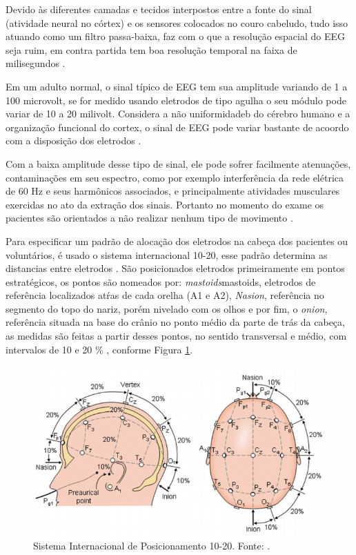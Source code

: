 Devido às diferentes camadas e tecidos interpostos entre a fonte do sinal (atividade neural no córtex) e os sensores colocados no couro cabeludo, tudo isso atuando como um filtro passa-baixa, faz com o que a resolução 
espacial do EEG seja ruim, em contra partida tem boa resolução temporal na faixa de milisegundos \cite{raobrain}.
 
Em um adulto normal, o sinal típico de EEG tem sua amplitude variando de 1 a 100 microvolt, se for medido usando eletrodos de tipo agulha o seu módulo pode variar de 10 a 20 milivolt. Considera a não uniformidadeb do cérebro humano e a organização funcional do cortex, o sinal de EEG pode variar bastante de acoordo com a disposição dos eletrodos \cite{SIULYDissertacao}.

Com a baixa amplitude desse tipo de sinal, ele pode sofrer facilmente atenuações, contaminações em seu espectro, como por exemplo interferência da rede elétrica de 60 Hz e seus harmônicos associados, e principalmente atividades musculares exercidas no ato da extração dos sinais. Portanto no momento do exame os pacientes são orientados a não realizar nenhum tipo de movimento \cite{raobrain}.

Para especificar um padrão de alocação dos eletrodos na cabeça dos pacientes ou voluntários, é usado o sistema internacional 10-20, esse padrão determina as distancias entre eletrodos \cite{Siulybook}. São posicionados eletrodos primeiramente em pontos estratégicos, os pontos são nomeados por: \textit{mastoids}mastoids, eletrodos de referência localizados atŕas de cada orelha (A1 e A2), \textit{Nasion}, referência no segmento do topo do nariz, porém nivelado com os olhos e por fim, o \textit{onion}, referência situada na base do crânio no ponto médio da parte de trás da cabeça, as medidas são feitas a partir desses pontos, no sentido transversal e médio,  com intervalos de 10 e 20 \% \cite{raobrain}, conforme Figura \ref{padrao1020}.

\begin{figure}[h]
	\centering
	\includegraphics[scale=0.75]{figuras/padrao1020.png}
	\caption{Sistema Internacional de Posicionamento 10-20. Fonte: \cite{campisi2012eeg}.}
	\label{padrao1020}
\end{figure}

